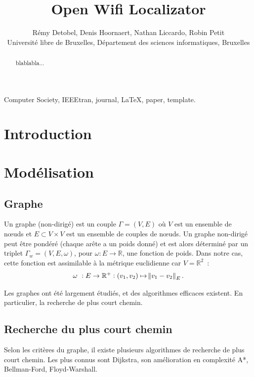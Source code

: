 \documentclass[11pt,journal,compsoc]{IEEEtran}
\newcommand{\R}{\mathbb R}
\begin{document}
\title{Open Wifi Localizator}
\author{Rémy Detobel, Denis Hoornaert, Nathan Liccardo, Robin Petit\\ Université libre de Bruxelles, Département des sciences informatiques, Bruxelles}

\maketitle

\begin{abstract}
  blablabla...
\end{abstract}
\begin{IEEEkeywords}
  Computer Society, IEEEtran, journal, \LaTeX, paper, template.
\end{IEEEkeywords}

\tableofcontents

\section{Introduction}
\section{Modélisation}
  \subsection{Graphe}
    Un graphe (non-dirigé) est un couple $\Gamma = (V, E)$ où $V$ est un ensemble de nœuds et $E \subset V \times V$ est un ensemble de couples de nœuds.
	Un graphe non-dirigé peut être pondéré (chaque arête a un poids donné) et est alors déterminé par un triplet $\Gamma_w = (V, E, \omega)$, pour
	$\omega \colon E \to \R$, une fonction de poids. Dans notre cas, cette fonction est assimilable à la métrique euclidienne car $V = \R^2$~:
	\begin{equation}
		\omega~: E \to \R^+ : (v_1, v_2) \mapsto \norm {v_1-v_2}_E.
	\end{equation}

	Les graphes ont été largement étudiés, et des algorithmes efficaces existent. En particulier, la recherche de plus court chemin.
  \subsection{Recherche du plus court chemin}
  	Selon les critères du graphe, il existe plusieurs algorithmes de recherche de plus court chemin. Les plus connus sont Dijkstra, son amélioration
	en complexité A*, Bellman-Ford, Floyd-Warshall.
\end{document}
